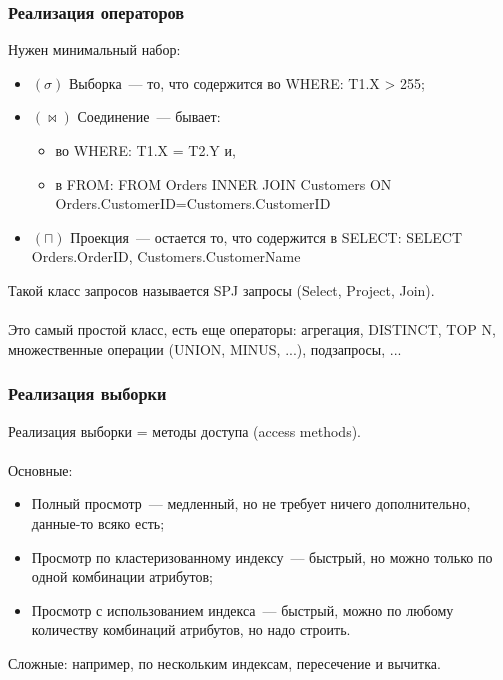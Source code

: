 \documentclass{beamer}
\begin{document}
\begin{frame}
\frametitle{Реализация операторов}

Нужен минимальный набор:

\begin{itemize}
  \item $(\sigma)$ Выборка~--- то, что содержится во WHERE: T1.X > 255;
  \item $(\bowtie)$ Соединение~--- бывает:
  \begin{itemize}
    \item во WHERE: T1.X = T2.Y и,
    \item в FROM: FROM Orders INNER JOIN Customers ON Orders.CustomerID=Customers.CustomerID
  \end{itemize}
  \item $(\sqcap)$ Проекция~--- остается то, что содержится в SELECT: SELECT Orders.OrderID, Customers.CustomerName
\end{itemize}

Такой класс запросов называется SPJ запросы (Select, Project, Join).\\~\\

Это самый простой класс, есть еще операторы: агрегация, DISTINCT, TOP N, множественные операции (UNION, MINUS, ...), подзапросы, ...

\end{frame}


\begin{frame}
\frametitle{Реализация выборки}

Реализация выборки = методы доступа (access methods). 
\\~\\
Основные:

\begin{itemize}
  \item Полный просмотр~--- медленный, но не требует ничего дополнительно, данные-то всяко есть;
  \item Просмотр по кластеризованному индексу~--- быстрый, но можно только по одной комбинации атрибутов;
  \item Просмотр с использованием индекса~--- быстрый, можно по любому количеству комбинаций атрибутов, но надо строить.
\end{itemize}

Сложные: например, по нескольким индексам, пересечение и вычитка.

\end{frame}
\end{document}
